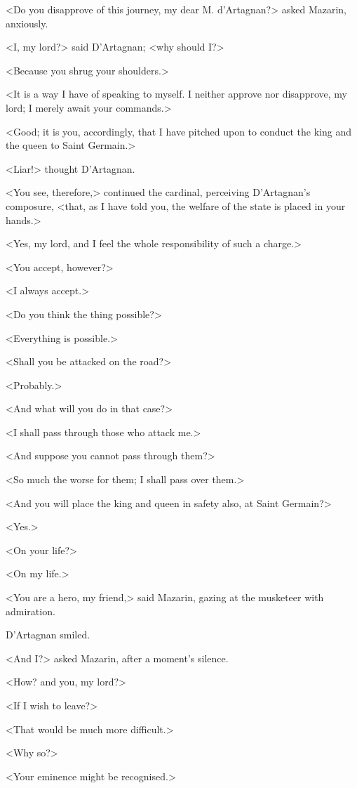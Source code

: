 <Do you disapprove of this journey, my dear M. d'Artagnan?> asked Mazarin, anxiously.

<I, my lord?> said D'Artagnan; <why should I?>

<Because you shrug your shoulders.>

<It is a way I have of speaking to myself. I neither approve nor disapprove, my lord; I merely await your commands.>

<Good; it is you, accordingly, that I have pitched upon to conduct the king and the queen to Saint Germain.>

<Liar!> thought D'Artagnan.

<You see, therefore,> continued the cardinal, perceiving D'Artagnan's composure, <that, as I have told you, the welfare of the state is placed in your hands.>

<Yes, my lord, and I feel the whole responsibility of such a charge.>

<You accept, however?>

<I always accept.>

<Do you think the thing possible?>

<Everything is possible.>

<Shall you be attacked on the road?>

<Probably.>

<And what will you do in that case?>

<I shall pass through those who attack me.>

<And suppose you cannot pass through them?>

<So much the worse for them; I shall pass over them.>

<And you will place the king and queen in safety also, at Saint Germain?>

<Yes.>

<On your life?>

<On my life.>

<You are a hero, my friend,> said Mazarin, gazing at the musketeer with admiration.

D'Artagnan smiled.

<And I?> asked Mazarin, after a moment's silence.

<How? and you, my lord?>

<If I wish to leave?>

<That would be much more difficult.>

<Why so?>

<Your eminence might be recognised.>

